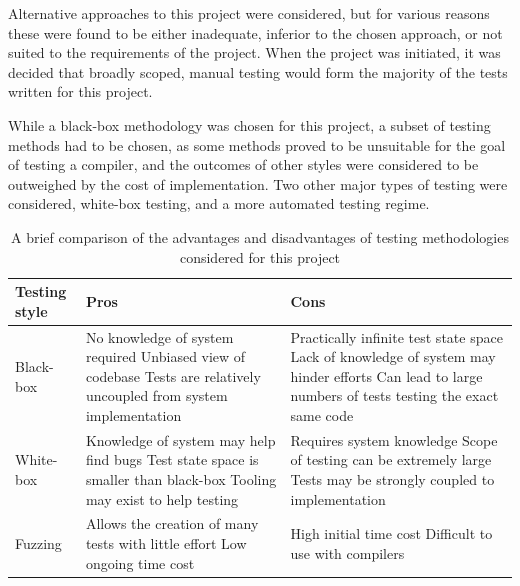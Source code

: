 Alternative approaches to this project were considered, but for various reasons these were found to be either inadequate, inferior to the chosen approach, or not suited to the requirements of the project. When the project was initiated, it was decided that broadly scoped, manual testing would form the majority of the tests written for this project. 

While a black-box methodology was chosen for this project, a subset of testing methods had to be chosen, as some methods proved to be unsuitable for the goal of testing a compiler, and the outcomes of other styles were considered to be outweighed by the cost of implementation.
Two other major types of testing were considered, white-box testing, and a more automated testing regime.

\begin{table}
\centering
\begin{threeparttable}
 \caption{A brief comparison of the advantages and disadvantages of testing methodologies considered for this project}
    \begin{tabular}{| l | p{65mm} | p{65mm} |}
    \hline
    \textbf{Testing style} & \textbf{Pros} & \textbf{Cons} \\ \hline
    Black-box &  No knowledge of system required \newline \newline Unbiased view of codebase \newline \newline Tests are relatively uncoupled from system implementation & Practically infinite test state space \newline \newline Lack of knowledge of system may hinder efforts \newline \newline Can lead to large numbers of tests testing the exact same code\\ \hline
    White-box & Knowledge of system may help find bugs \newline \newline Test state space is smaller than black-box \newline \newline Tooling may exist to help testing &  Requires system knowledge \newline \newline Scope of testing can be extremely large \newline \newline Tests may be strongly coupled to implementation  \\ \hline
    Fuzzing & Allows the creation of many tests with little effort \newline \newline Low ongoing time cost  & High initial time cost \newline \newline Difficult to use with compilers \\ \hline
    \end{tabular}
\end{threeparttable}
\end{table}

